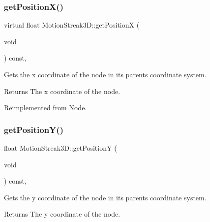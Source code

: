 \mbox{\label{classMotionStreak3D_a1cbae92f092d3fb20371a676de053d07}} 
\subsubsection{\texorpdfstring{get\+Position\+X()}{getPositionX()}\hspace{0.1cm}{\footnotesize\ttfamily [2/2]}}
{\footnotesize\ttfamily virtual float Motion\+Streak3\+D\+::get\+PositionX (\begin{DoxyParamCaption}\item[{void}]{ }\end{DoxyParamCaption}) const\hspace{0.3cm}{\ttfamily [override]}, {\ttfamily [virtual]}}

Gets the x coordinate of the node in its parent\textquotesingle{}s coordinate system.

\begin{DoxyReturn}{Returns}
The x coordinate of the node. 
\end{DoxyReturn}


Reimplemented from \hyperlink{classNode_ad4b27cd8bc98960789fbd2b574666a25}{Node}.

\mbox{\label{classMotionStreak3D_aad2e9762fabf564601865096174a9b54}} 
\subsubsection{\texorpdfstring{get\+Position\+Y()}{getPositionY()}\hspace{0.1cm}{\footnotesize\ttfamily [1/2]}}
{\footnotesize\ttfamily float Motion\+Streak3\+D\+::get\+PositionY (\begin{DoxyParamCaption}\item[{void}]{ }\end{DoxyParamCaption}) const\hspace{0.3cm}{\ttfamily [override]}, {\ttfamily [virtual]}}

Gets the y coordinate of the node in its parent\textquotesingle{}s coordinate system.

\begin{DoxyReturn}{Returns}
The y coordinate of the node. 
\end{DoxyReturn}


